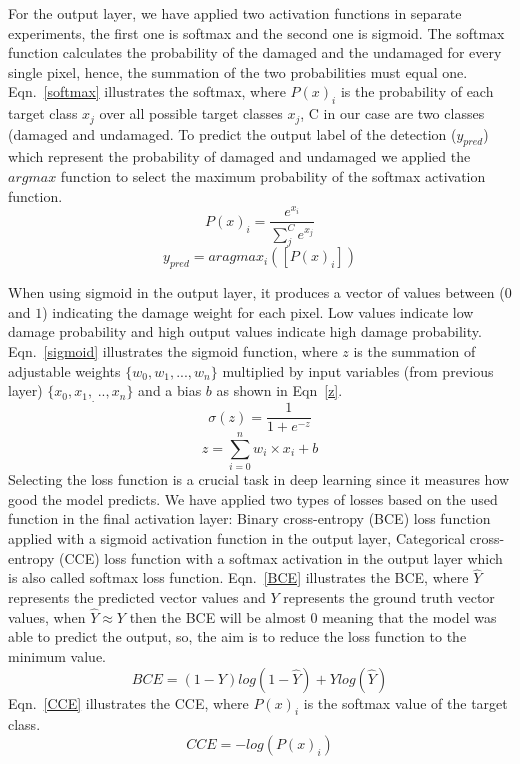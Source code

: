 \documentclass[preprint,9pt]{elsarticle}
\begin{document}
	For the output layer, we have applied two activation functions in separate experiments, the first one is softmax and the second one is sigmoid. 
	The softmax function calculates the probability of the damaged and the undamaged for every single pixel, hence, the summation of the two probabilities must equal one. Eqn.~\ref{softmax} illustrates the softmax, where \(P(x)_{i}\) is the probability of each target class \(x_{j}\) over all possible target classes \(x_{j}\), C in our case are two classes  (damaged and undamaged.
	To predict the output label of the detection (\(y_{pred}\)) which represent the probability of damaged and undamaged we applied the \(argmax\) function to select the maximum probability of the softmax activation function.
	\begin{equation}
		P(x)_{i} = \frac{e^{x_{i}}}{\sum_{j}^{C} e^{x_{j}}}
		\label{softmax}
	\end{equation} 
	\begin{equation}
		y_{pred} = aragmax_{i}\left( \left[P(x)_{i}\right]\right)
		\label{argmax}
	\end{equation}

	When using sigmoid in the output layer, it produces a vector of values between (\(0\) and \(1\)) indicating the damage weight for each pixel. 
	Low values indicate low damage probability and high output values indicate high damage probability. Eqn.~\ref{sigmoid} illustrates the sigmoid function, 
	where \(z\) is the summation of adjustable weights \(\{w_0,w_1,...,w_n \}\) multiplied by input variables (from previous layer) \(\{x_0,x_1,_...,x_n\}\) and a bias \(b\) as shown in Eqn~\ref{z}.	
	\begin{equation}
		\sigma(z) = \frac{1}{1+e^{-z}}
		\label{sigmoid}
	\end{equation}
	\begin{equation}
		z= \sum_{i=0}^{n}  w_i\times x_i +b
		\label{z}
	\end{equation}
	Selecting the loss function is a crucial task in deep learning since it measures how good the model predicts.
	We have applied two types of losses based on the used function in the final activation layer: Binary cross-entropy (BCE) loss function applied with a sigmoid activation function in the output layer, Categorical cross-entropy (CCE) loss function with a softmax activation in the output layer which is also called softmax loss function.
	Eqn.~\ref{BCE} illustrates the BCE, where \(\hat{Y}\) represents the predicted vector values and \(Y\) represents the ground truth vector values, when \(\hat{Y} \approx Y\) then the BCE will be almost \(0\) meaning that the model was able to predict the output, so, the aim is to reduce the loss function to the minimum value.
	\begin{equation}
		BCE = (1-Y)log(1-\hat{Y})+Ylog(\hat{Y})
		\label{BCE}
	\end{equation}
	Eqn.~\ref{CCE} illustrates the CCE, where \( P(x)_{i}\) is the softmax value of the target class. 
	\begin{equation}
	CCE = -log\left( P(x)_{i} \right)
	\label{CCE}
	\end{equation}
\end{document}
